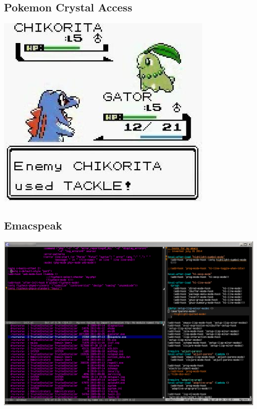 \documentclass[11pt]{article}
\begin{document}
\subsection*{Pokemon Crystal Access}
\label{sec:orgheadline12}
\includegraphics[width=.9\linewidth]{./images/poke.jpg}
\subsection*{Emacspeak}
\label{sec:orgheadline13}
\includegraphics[width=.9\linewidth]{./images/emacs.png}
\end{document}
